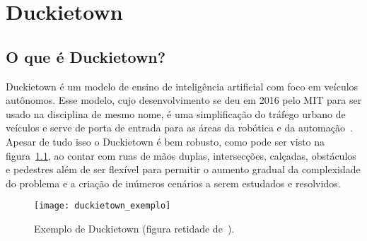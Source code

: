 

\chapter{Duckietown}
\label{cap:duckietown}

\section{O que é Duckietown?}
\label{sec:o-que-e-duckietown}

\enlargethispage{.5\baselineskip}

Duckietown é um modelo de ensino de inteligência artificial com foco em veículos autônomos. Esse modelo, cujo desenvolvimento se deu em 2016 pelo MIT para ser usado na disciplina de mesmo nome, é uma simplificação do tráfego urbano de veículos e serve de porta de entrada para as áreas da robótica e da automação~\citep{duckietown-historia}. Apesar de tudo isso o Duckietown é bem robusto, como pode ser visto na figura~\ref{fig:duckietown_exemplo}, ao contar com ruas de mãos duplas, intersecções, calçadas, obstáculos e pedestres além de ser flexível para permitir o aumento gradual da complexidade do problema e a criação de inúmeros cenários a serem estudados e resolvidos.

\begin{figure}
	\centering
	\texttt{[image: duckietown\_exemplo]}
	\caption{Exemplo de Duckietown (figura retidade de~\citep{duckietown-guia}).\label{fig:duckietown_exemplo}}
\end{figure}

